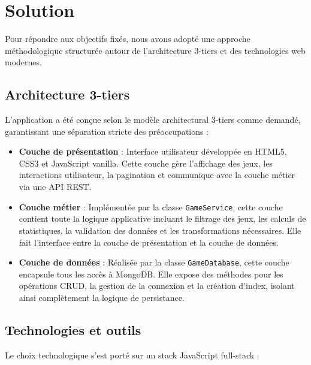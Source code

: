 \section{Solution}
\label{sec:intro_sol}

Pour répondre aux objectifs fixés, nous avons adopté une approche méthodologique structurée autour de l'architecture 3-tiers et des technologies web modernes.

\subsection{Architecture 3-tiers}
\label{sec:intro_architecture}

L'application a été conçue selon le modèle architectural 3-tiers comme demandé, garantissant une séparation stricte des préoccupations :

\begin{itemize}
    \item \textbf{Couche de présentation} : Interface utilisateur développée en HTML5, CSS3 et JavaScript vanilla. Cette couche gère l'affichage des jeux, les interactions utilisateur, la pagination et communique avec la couche métier via une API REST.
    
    \item \textbf{Couche métier} : Implémentée par la classe \texttt{GameService}, cette couche contient toute la logique applicative incluant le filtrage des jeux, les calculs de statistiques, la validation des données et les transformations nécessaires. Elle fait l'interface entre la couche de présentation et la couche de données.
    
    \item \textbf{Couche de données} : Réalisée par la classe \texttt{GameDatabase}, cette couche encapsule tous les accès à MongoDB. Elle expose des méthodes pour les opérations CRUD, la gestion de la connexion et la création d'index, isolant ainsi complètement la logique de persistance.
\end{itemize}

\subsection{Technologies et outils}
\label{sec:intro_technologies}

Le choix technologique s'est porté sur un stack JavaScript full-stack :

